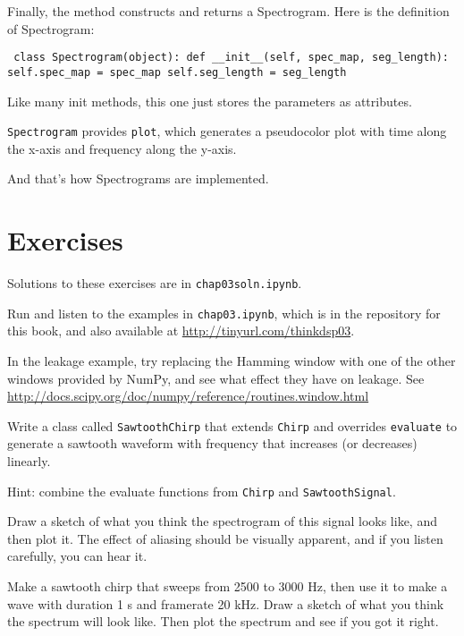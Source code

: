 \documentclass[12pt]{book} \usepackage[width=5.5in,height=8.5in, hmarginratio=3:2,vmarginratio=1:1]{geometry}
\begin{document}
Finally, the method constructs and returns a Spectrogram. Here is the definition of Spectrogram: 

\begin{verbatim} class Spectrogram(object): def __init__(self, spec_map, seg_length): self.spec_map = spec_map self.seg_length = seg_length \end{verbatim} 

Like many init methods, this one just stores the parameters as attributes. 

{\tt Spectrogram} provides {\tt plot}, which generates a pseudocolor plot with time along the x-axis and frequency along the y-axis. 

And that's how Spectrograms are implemented. 

\section{Exercises} 

Solutions to these exercises are in {\tt chap03soln.ipynb}. 

\begin{exercise} Run and listen to the examples in {\tt chap03.ipynb}, which is in the repository for this book, and also available at \url{http://tinyurl.com/thinkdsp03}. 

In the leakage example, try replacing the Hamming window with one of the other windows provided by NumPy, and see what effect they have on leakage. See \url{http://docs.scipy.org/doc/numpy/reference/routines.window.html} \end{exercise} 

\begin{exercise} Write a class called {\tt SawtoothChirp} that extends {\tt Chirp} and overrides {\tt evaluate} to generate a sawtooth waveform with frequency that increases (or decreases) linearly. 

Hint: combine the evaluate functions from {\tt Chirp} and {\tt SawtoothSignal}. 

Draw a sketch of what you think the spectrogram of this signal looks like, and then plot it. The effect of aliasing should be visually apparent, and if you listen carefully, you can hear it. \end{exercise} 

\begin{exercise} Make a sawtooth chirp that sweeps from 2500 to 3000 Hz, then use it to make a wave with duration 1 s and framerate 20 kHz. Draw a sketch of what you think the spectrum will look like. Then plot the spectrum and see if you got it right. \end{exercise} 
\end{document}
